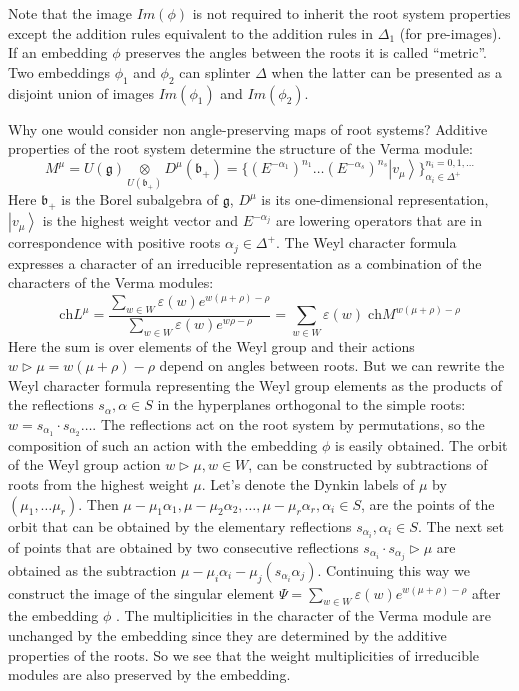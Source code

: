 \documentclass[12pt]{article}
\newcommand{\gf}{\mathfrak{g}}
\newcommand{\bff}{\mathfrak{b}}
\begin{document}
Note that the image $Im(\phi)$ is not required to inherit the root system properties except the
addition rules equivalent to the addition rules in $\Delta_{1}$ (for pre-images). If an embedding
$\phi$ preserves the angles between the roots it is called ``metric''. Two embeddings $\phi_1$ and
$\phi_2$ can splinter $\Delta$ when the latter can be presented as a disjoint union of images
$Im(\phi_1)$ and $Im(\phi_2)$.

Why one would consider non angle-preserving maps of root systems? Additive properties of the root system
determine the structure of the Verma module:
    \begin{equation*}
      M^{\mu}=U(\gf)\underset{U(\bff_{+})}{\otimes} D^{\mu}(\bff_{+})=\{(E^{-\alpha_{1}})^{n_{1}}\dots (E^{-\alpha_{s}})^{n_{s}} \left|v_{\mu}\right>\}_{\alpha_{i}\in\Delta^{+}}^{n_{i}=0,1,\dots}
    \end{equation*}
Here $\bff_{+}$ is the Borel subalgebra of $\gf$, $D^{\mu}$ is its one-dimensional representation,
$\left|v_{\mu}\right>$ is the highest weight vector and $E^{-\alpha_{j}}$ are lowering operators
that are in correspondence with positive roots $\alpha_{j}\in \Delta^{+}$. 
The Weyl character formula expresses a character of an irreducible representation as a combination of
the characters of the Verma modules: 
\begin{equation*}
  \mathrm{ch} L^{\mu}=\frac{\sum_{w\in W} \varepsilon(w) e^{w(\mu+\rho)-\rho}}{\sum_{w\in W}\varepsilon(w) e^{w\rho-\rho}}=\sum_{w\in W} \varepsilon(w)\; \mathrm{ch} M^{w(\mu+\rho)-\rho}
\end{equation*}
Here the sum is over elements of the Weyl group and their actions $w\triangleright \mu
=w(\mu+\rho)-\rho$ depend on angles between roots. But we can rewrite the Weyl character formula
representing the Weyl group elements as the products of the reflections $s_{\alpha}, \alpha \in S$ in
the hyperplanes orthogonal to the simple roots: $w=s_{\alpha_{1}}\cdot s_{\alpha_{2}}\dots$. The reflections act
on the root system by permutations, so the composition of such an action with the embedding $\phi$ is easily
obtained. The orbit of the Weyl group action $w\triangleright \mu, w\in W$, can be constructed by
subtractions of roots from the highest weight $\mu$. Let's denote the Dynkin labels of $\mu$ by
$(\mu_{1},\dots \mu_{r})$. Then $\mu-\mu_{1}\alpha_{1}, \mu-\mu_{2}\alpha_{2},\dots,
\mu-\mu_{r}\alpha_{r}, \alpha_{i}\in S$, are the points of the orbit that can be obtained by
the elementary reflections $s_{\alpha_{i}}, \alpha_{i}\in S$. The next set of points that are obtained by
two consecutive reflections $s_{\alpha_{i}}\cdot s_{\alpha_{j}}\triangleright\mu$ are obtained as
the subtraction $\mu-\mu_{i}\alpha_{i}-\mu_{j} (s_{\alpha_{i}}\alpha_{j})$. Continuing this way we
construct the image of the singular element $\Psi=\sum_{w\in W} \varepsilon(w) e^{w(\mu+\rho)-\rho}$
after the embedding $\phi$ \cite{2011arXiv1111.6787L}. The multiplicities in the character of the Verma
module are unchanged by the embedding since they are determined by the additive properties of the roots.
So we see that the weight multiplicities of irreducible modules are also preserved by the embedding.
\end{document}
